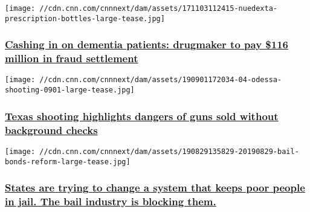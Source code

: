 \texttt{[image: //cdn.cnn.com/cnnnext/dam/assets/171103112415-nuedexta-prescription-bottles-large-tease.jpg]}

\hypertarget{cashing-in-on-dementia-patients-drugmaker-to-pay-116-million-in-fraud-settlement}{%
\subsubsection{\texorpdfstring{\href{/2019/09/26/health/nuedexta-avanir-doj-settlement-invs/index.html}{Cashing
in on dementia patients: drugmaker to pay \$116 million in fraud
settlement}}{Cashing in on dementia patients: drugmaker to pay \$116 million in fraud settlement}}\label{cashing-in-on-dementia-patients-drugmaker-to-pay-116-million-in-fraud-settlement}}

\href{/2019/09/09/us/universal-background-checks-guns-texas-shooting-invs/index.html}{}

\texttt{[image: //cdn.cnn.com/cnnnext/dam/assets/190901172034-04-odessa-shooting-0901-large-tease.jpg]}

\hypertarget{texas-shooting-highlights-dangers-of-guns-sold-without-background-checks}{%
\subsubsection{\texorpdfstring{\href{/2019/09/09/us/universal-background-checks-guns-texas-shooting-invs/index.html}{Texas
shooting highlights dangers of guns sold without background
checks}}{Texas shooting highlights dangers of guns sold without background checks}}\label{texas-shooting-highlights-dangers-of-guns-sold-without-background-checks}}

\href{/2019/08/30/us/bail-reform-bonds-lobbying-invs/index.html}{}

\texttt{[image: //cdn.cnn.com/cnnnext/dam/assets/190829135829-20190829-bail-bonds-reform-large-tease.jpg]}

\hypertarget{states-are-trying-to-change-a-system-that-keeps-poor-people-in-jail-the-bail-industry-is-blocking-them}{%
\subsubsection{\texorpdfstring{\href{/2019/08/30/us/bail-reform-bonds-lobbying-invs/index.html}{States
are trying to change a system that keeps poor people in jail. The bail
industry is blocking
them.}}{States are trying to change a system that keeps poor people in jail. The bail industry is blocking them.}}\label{states-are-trying-to-change-a-system-that-keeps-poor-people-in-jail-the-bail-industry-is-blocking-them}}

